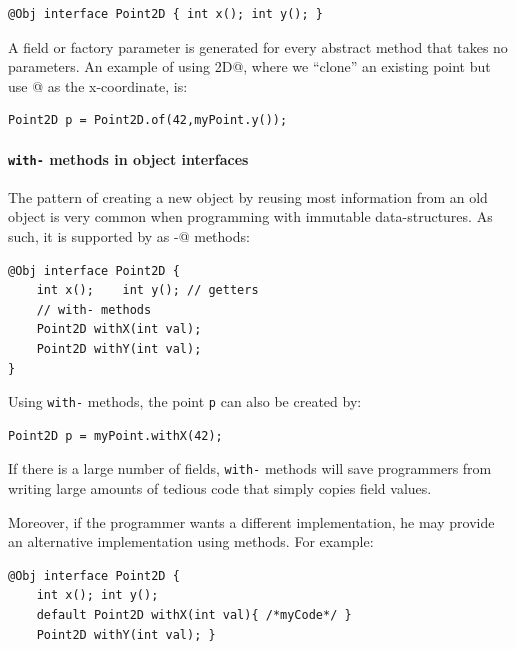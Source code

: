\begin{lstlisting}
@Obj interface Point2D { int x(); int y(); }
\end{lstlisting}

\noindent A field or factory parameter is generated for every
abstract method that takes no parameters.
 An example of using \Q@Point2D@, where we ``clone'' an existing point
 but use
 @ as the x-coordinate, is:
\begin{lstlisting}
Point2D p = Point2D.of(42,myPoint.y());
\end{lstlisting}

\paragraph{\texttt{with-} methods in object interfaces}
The pattern of creating a new object by reusing most information from an old
object is very common when programming with immutable
data-structures. As such, it is
supported by \mixin as \Q@with-@ methods:
\begin{lstlisting}
@Obj interface Point2D {
    int x();    int y(); // getters
    // with- methods
    Point2D withX(int val);
    Point2D withY(int val);
}
\end{lstlisting}

\noindent Using \texttt{with-} methods, the point \texttt{p} can also be created
by:

\begin{lstlisting}
Point2D p = myPoint.withX(42);
\end{lstlisting}

\noindent If there is a large number of fields, \texttt{with-} methods
will save programmers from writing large amounts of tedious code that
simply copies field values.

Moreover, if the programmer wants a different implementation, he may
provide an alternative implementation using \Q@default@ methods. For example:
\begin{lstlisting}
@Obj interface Point2D {
    int x(); int y();
    default Point2D withX(int val){ /*myCode*/ }
    Point2D withY(int val); }
\end{lstlisting}

